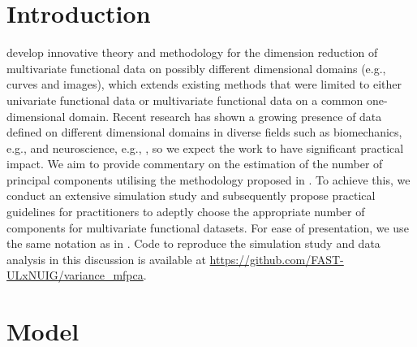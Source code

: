 
\section{Introduction} %
\label{sec:introduction}

\cite{happMultivariateFunctionalPrincipal2018} develop innovative theory and methodology for the dimension reduction of multivariate functional data on possibly different dimensional domains (e.g., curves and images), which extends existing methods that were limited to either univariate functional data or multivariate functional data on a common one-dimensional domain. Recent research has shown a growing presence of data defined on different dimensional domains in diverse fields such as biomechanics, e.g., \cite{warmenhovenBivariateFunctionalPrincipal2019} and neuroscience, e.g., \cite{songSparseMultivariateFunctional2022}, so we expect the work to have significant practical impact. We aim to provide commentary on the estimation of the number of principal components utilising the methodology proposed in \cite{happMultivariateFunctionalPrincipal2018}. To achieve this, we conduct an extensive simulation study and subsequently propose practical guidelines for practitioners to adeptly choose the appropriate number of components for multivariate functional datasets. For ease of presentation, we use the same notation as in \cite{happMultivariateFunctionalPrincipal2018}. Code to reproduce the simulation study and data analysis in this discussion is available at \url{https://github.com/FAST-ULxNUIG/variance_mfpca}.


\section{Model} %
\label{sec:model}

